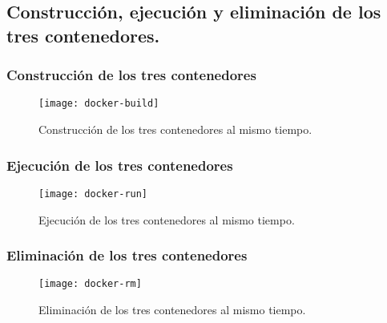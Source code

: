 \subsection{Construcción, ejecución y eliminación de los tres contenedores.}

\subsubsection{Construcción de los tres contenedores}
\begin{figure}[H]
    \texttt{[image: docker-build]}
    \centering
    \caption{Construcción de los tres contenedores al mismo tiempo.}
    \label{fig:docker-build}
 \end{figure}

\subsubsection{Ejecución de los tres contenedores}

\begin{listing}[style=consola]
    $ 
\end{listing} 

\begin{figure}[H]
   \texttt{[image: docker-run]}
   \centering
   \caption{Ejecución de los tres contenedores al mismo tiempo.}
   \label{fig:docker-run}
\end{figure}


\subsubsection{Eliminación de los tres contenedores}

 \begin{figure}[H]
	\texttt{[image: docker-rm]}
	\centering
	\caption{Eliminación de los tres contenedores al mismo tiempo.}
    \label{fig:docker-rm}
\end{figure}
